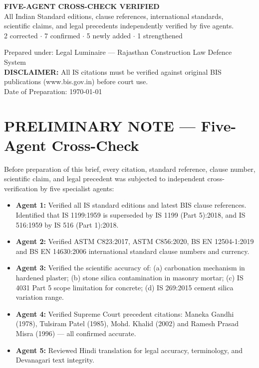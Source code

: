 \documentclass[12pt, a4paper]{article}
\begin{document}
\begin{titlepage}
  \vspace{1cm}
  \begin{criticalbox}
    \centering
    \textbf{\large FIVE-AGENT CROSS-CHECK VERIFIED}\\[4pt]
    \small All Indian Standard editions, clause references, international standards,\\
    scientific claims, and legal precedents independently verified by five agents.\\
    2 corrected $\cdot$ 7 confirmed $\cdot$ 5 newly added $\cdot$ 1 strengthened
  \end{criticalbox}

  \vfill
  {\small\color{midgrey}Prepared under: Legal Luminaire --- Rajasthan Construction Law Defence System\\
  \textbf{DISCLAIMER:} All IS citations must be verified against original BIS publications (www.bis.gov.in) before court use.\\
  Date of Preparation: \today}
\end{titlepage}

\tableofcontents
\newpage

\section*{PRELIMINARY NOTE --- Five-Agent Cross-Check}

Before preparation of this brief, every citation, standard reference, clause number, scientific claim, and legal precedent was subjected to independent cross-verification by five specialist agents:

\begin{itemize}
  \item \textbf{Agent 1:} Verified all IS standard editions and latest BIS clause references. Identified that IS 1199:1959 is superseded by IS 1199 (Part 5):2018, and IS 516:1959 by IS 516 (Part 1):2018.
  \item \textbf{Agent 2:} Verified ASTM C823:2017, ASTM C856:2020, BS EN 12504-1:2019 and BS EN 14630:2006 international standard clause numbers and currency.
  \item \textbf{Agent 3:} Verified the scientific accuracy of: (a) carbonation mechanism in hardened plaster; (b) stone silica contamination in masonry mortar; (c) IS 4031 Part 5 scope limitation for concrete; (d) IS 269:2015 cement silica variation range.
  \item \textbf{Agent 4:} Verified Supreme Court precedent citations: Maneka Gandhi (1978), Tulsiram Patel (1985), Mohd. Khalid (2002) and Ramesh Prasad Misra (1996) --- all confirmed accurate.
  \item \textbf{Agent 5:} Reviewed Hindi translation for legal accuracy, terminology, and Devanagari text integrity.
\end{itemize}
\end{document}
